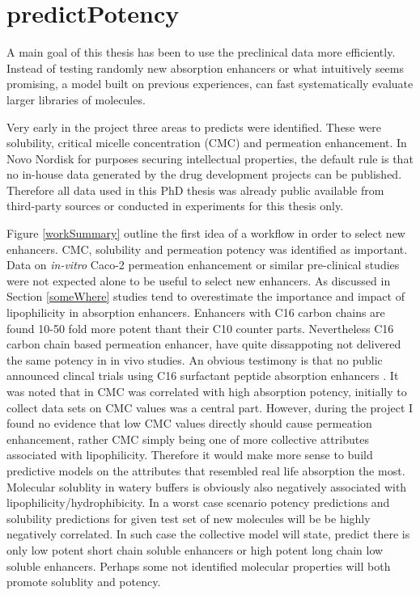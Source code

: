 \chapter{predictPotency}

A main goal of this thesis has been to use the preclinical data more efficiently. Instead of testing randomly new absorption enhancers or what intuitively seems promising, a model built on previous experiences, can fast systematically evaluate larger libraries of molecules.

Very early in the project three areas to predicts were identified. These were solubility, critical micelle concentration (CMC) and permeation enhancement. In Novo Nordisk for purposes securing intellectual properties, the default rule is that no in-house data generated by the drug development projects can be published. Therefore all data used in this PhD thesis was already public available from third-party sources or conducted in experiments for this thesis only. 

Figure \ref{workSummary} outline the first idea of a workflow in order to select new enhancers. CMC, solubility and permeation potency was identified as important. Data on \textit{in-vitro} Caco-2 permeation enhancement or similar pre-clinical studies were not expected alone to be useful to select new enhancers. As discussed in Section \ref{someWhere}  studies tend to overestimate the importance and impact of lipophilicity in absorption enhancers. Enhancers with C16 carbon chains are found 10-50 fold more potent thant their C10 counter parts. Nevertheless  C16 carbon chain based permeation enhancer, have quite dissappoting not delivered the same potency in in vivo studies. An obvious testimony is that no public announced clincal trials using C16 surfactant peptide absorption enhancers \cite{aguirre2016current}. It was noted that in CMC was correlated with high absorption potency, initially to collect data sets on CMC values was a central part. However, during the project I found no evidence that low CMC values directly should cause permeation enhancement, rather CMC simply being one of more collective attributes associated with lipophilicity. Therefore it would make more sense to build predictive models on the attributes that resembled real life absorption the most. Molecular solublity in watery buffers is obviously also negatively associated with lipophilicity/hydrophibicity. In a worst case scenario potency predictions and solubility predictions for given test set of new molecules will be be highly negatively correlated. In such case the collective model will state, predict there is only low potent short chain soluble enhancers or high potent long chain low soluble enhancers. Perhaps some not identified molecular properties will both promote solublity and potency.

